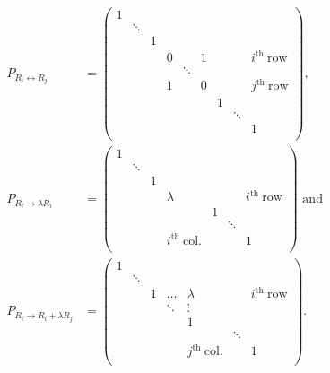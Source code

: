 \documentclass[a4paper,12pt]{report}
\begin{document}
\begin{appendices}
\begin{equation}
    \begin{aligned}
    P_{R_{i} \leftrightarrow R_{j}  } &= \begin{pmatrix}
        1 &  &  &  &  &  &  &  &   \\
         & \ddots  &  &  &  &  &  &  &   \\
         &  & 1 &  &  &  &  &  &   \\
         &  &  & 0 &  & 1 &  &  & i^{\text{th }}\text{row}    \\
         &  &  &  & \ddots  &  &  &  &   \\
         &  &  & 1 &  & 0 &  &  & j^{\text{th }}\text{row}   \\
         &  &  &  &  &  & 1 &  &   \\
         &  &  &  &  &  &  & \ddots  &   \\
         &  &  &  &  &  &  &  &  1 \\
    \end{pmatrix}, \\
    P_{R_{i} \rightarrow \lambda R_{i}  } &= \begin{pmatrix}
        1 &  &  &  &  &  &   \\
         & \ddots  &  &  &  &  &   \\
         &  & 1 &  &  &  &   \\
         &  &  & \lambda  &  &  & i^{\text{th }}\text{row}   \\
         &  &  &  & 1 &  &   \\
         &  &  &  &  & \ddots  &   \\
         &  &  & i^{\text{th }}\text{col.}  &  &  &  1 \\
    \end{pmatrix} \text { and } \\
    P_{R_{i} \rightarrow R_{i}+\lambda R_{j}   } &= \begin{pmatrix}
        1 &  &  &  &  &  &   \\
         & \ddots  &  &  &  &  &   \\
         &  & 1 & \ldots  & \lambda  &  & i^{\text{th }}\text{row}   \\
         &  &  & \ddots  & \vdots  &  &   \\
         &  &  &  & 1 &  &   \\
         &  &  &  &  & \ddots  &   \\
         &  &  &  & j^{\text{th }}\text{col.}  &  & 1  \\
    \end{pmatrix} .
    \end{aligned}
\end{equation}




\end{appendices}
\end{document}
